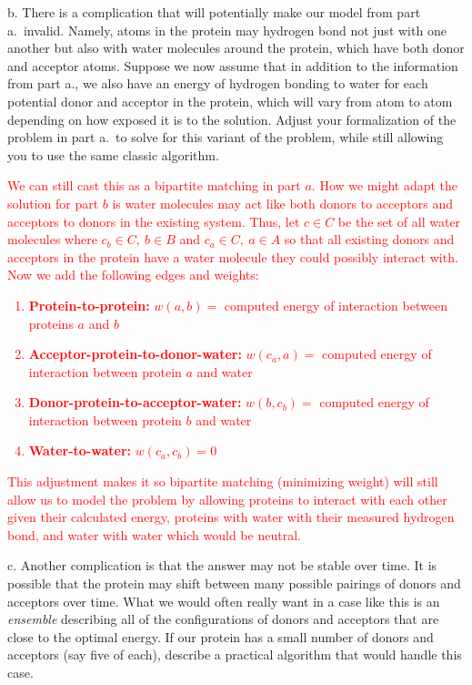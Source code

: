 \documentclass[11pt]{article}
\begin{document}
b. There is a complication that will potentially make our model from
part a.~invalid.  Namely, atoms in the protein may hydrogen bond not
just with one another but also with water molecules around the
protein, which have both donor and acceptor atoms. Suppose we now
assume that in addition to the information from part a., we also have
an energy of hydrogen bonding to water for each potential donor and
acceptor in the protein, which will vary from atom to atom depending
on how exposed it is to the solution.  Adjust your formalization of
the problem in part a.~to solve for this variant of the problem, while
still allowing you to use the same classic algorithm.

\textcolor{red}{
We can still cast this as a bipartite matching in part $a$. How we might adapt the solution for part $b$ is water molecules may act like both donors to acceptors and acceptors to donors in the existing system. Thus, let $c \in C$ be the set of all water molecules where $c_b \in C,\ b \in B$ and $c_a \in C,\ a \in A$ so that all existing donors and acceptors in the protein have a water molecule they could possibly interact with.\\
Now we add the following edges and weights:
\begin{enumerate}
    \item \textbf{Protein-to-protein:} $w(a, b) = $ computed energy of interaction between proteins $a$ and $b$
    \item \textbf{Acceptor-protein-to-donor-water:} $w(c_a, a) = $ computed energy of interaction between protein $a$ and water
    \item \textbf{Donor-protein-to-acceptor-water:} $w(b, c_b) = $ computed energy of interaction between protein $b$ and water
    \item \textbf{Water-to-water:} $w(c_a, c_b) = 0$
\end{enumerate}
This adjustment makes it so bipartite matching (minimizing weight) will still allow us to model the problem by allowing proteins to interact with each other given their calculated energy, proteins with water with their measured hydrogen bond, and water with water which would be neutral.
}

c. Another complication is that the answer may not be stable over
time.  It is possible that the protein may shift between many possible
pairings of donors and acceptors over time.  What we would often
really want in a case like this is an {\em ensemble} describing all of
the configurations of donors and acceptors that are close to the
optimal energy.  If our protein has a small number of donors and
acceptors (say five of each), describe a practical algorithm that
would handle this case.
\end{document}
